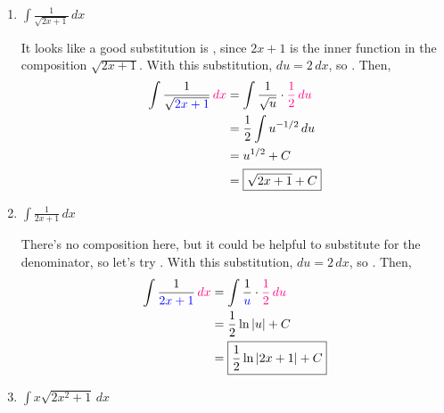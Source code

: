 \documentclass{article}
\begin{document}
\begin{enumerate}
  \probonly{}
    \begin{enumerate}
    \item
      \begin{problem}[\vfill]
        $\displaystyle \int \frac{1}{\sqrt{2x+1}}\,dx$
      \end{problem}

      \begin{solution}
        It looks like a good substitution is , since $2x
        + 1$ is the inner function in the composition $\sqrt{2x + 1}$.
        With this substitution, $du = 2\,dx$, so .  Then,
        \begin{align*}
          \int \frac{1}{\sqrt{\sub{2x+1}}}\,\subd{dx} &= \int
          \frac{1}{\sqrt{u}} \cdot \subd{\frac{1}{2}\,du} \\
          &= \frac{1}{2} \int u^{-1/2}\,du \\
          &= u^{1/2} + C \\
          &= \boxed{\sqrt{2x + 1} + C}
        \end{align*}
      \end{solution}

      \pspace{\newpage}

    \item
      \begin{problem}[\vfill]
        $\displaystyle \int \frac{1}{2x+1}\,dx$
      \end{problem}

      \begin{solution}
        There's no composition here, but it could be helpful to substitute
        for the denominator, so let's try .  With this
        substitution, $du = 2\,dx$, so .
        Then,
        \begin{align*}
          \int \frac{1}{\sub{2x+1}}\,\subd{dx} &= \int \frac{1}{\sub{u}}
          \cdot \subd{\frac{1}{2}\,du} \\
          &= \frac{1}{2} \ln |u| + C \\
          &= \boxed{\frac{1}{2} \ln |2x + 1| + C}
        \end{align*}
      \end{solution}

    \item
      \begin{problem}[\vfill]
        $\displaystyle \int x \sqrt{2x^2+1}\,dx$
      \end{problem}


\end{enumerate}
\end{enumerate}
\end{document}
